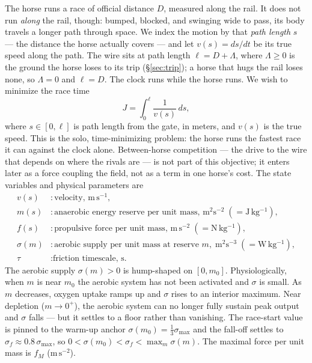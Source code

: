\documentclass[11pt]{article}
\begin{document}
The horse runs a race of official distance $D$, measured along the rail. It does not run \emph{along} the rail, though: bumped, blocked, and swinging wide to pass, its body travels a longer path through space. We index the motion by that \emph{path length} $s$ --- the distance the horse actually covers --- and let $v(s) = ds/dt$ be its true speed along the path. The wire sits at path length $\ell = D + \Lambda$, where $\Lambda \geq 0$ is the ground the horse loses to its trip (\S\ref{sec:trip}); a horse that hugs the rail loses none, so $\Lambda = 0$ and $\ell = D$. The clock runs while the horse runs. We wish to minimize the race time
\begin{equation}
J = \int_0^\ell \frac{1}{v(s)}\, ds,
\end{equation}
where $s \in [0, \ell]$ is path length from the gate, in meters, and $v(s)$ is the true speed. This is the solo, time-minimizing problem: the horse runs the fastest race it can against the clock alone. Between-horse competition --- the drive to the wire that depends on where the rivals are --- is not part of this objective; it enters later as a force coupling the field, not as a term in one horse's cost. The state variables and physical parameters are
\begin{align*}
v(s) &: \text{velocity, } \mathrm{m\,s^{-1}}, \\
m(s) &: \text{anaerobic energy reserve per unit mass, } \mathrm{m^2 s^{-2}} \;(= \mathrm{J\,kg^{-1}}), \\
f(s) &: \text{propulsive force per unit mass, } \mathrm{m\,s^{-2}} \;(= \mathrm{N\,kg^{-1}}), \\
\sigma(m) &: \text{aerobic supply per unit mass at reserve } m, \; \mathrm{m^2 s^{-3}} \;(= \mathrm{W\,kg^{-1}}), \\
\tau &: \text{friction timescale, s.}
\end{align*}
The aerobic supply $\sigma(m) > 0$ is hump-shaped on $[0, m_0]$. Physiologically, when $m$ is near $m_0$ the aerobic system has not been activated and $\sigma$ is small. As $m$ decreases, oxygen uptake ramps up and $\sigma$ rises to an interior maximum. Near depletion ($m \to 0^+$), the aerobic system can no longer fully sustain peak output and $\sigma$ falls --- but it settles to a floor rather than vanishing. The race-start value is pinned to the warm-up anchor $\sigma(m_0) = \tfrac13\sigma_{\max}$ and the fall-off settles to $\sigma_f \approx 0.8\,\sigma_{\max}$, so $0 < \sigma(m_0) < \sigma_f < \max_m \sigma(m)$. The maximal force per unit mass is $f_M$ ($\mathrm{m\,s^{-2}}$).
\end{document}
